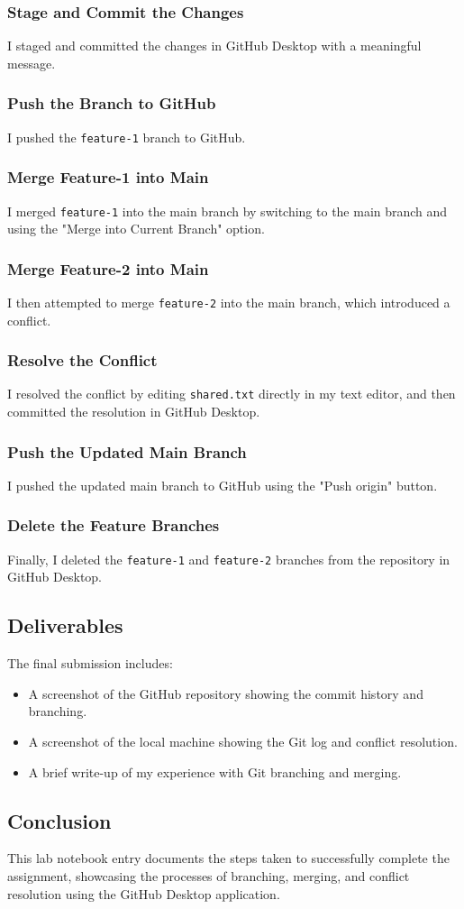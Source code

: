 \subsubsection{Stage and Commit the Changes}
I staged and committed the changes in GitHub Desktop with a meaningful message.

\subsubsection{Push the Branch to GitHub}
I pushed the \texttt{feature-1} branch to GitHub.

\subsubsection{Merge Feature-1 into Main}
I merged \texttt{feature-1} into the main branch by switching to the main branch and using the "Merge into Current Branch" option.

\subsubsection{Merge Feature-2 into Main}
I then attempted to merge \texttt{feature-2} into the main branch, which introduced a conflict.

\subsubsection{Resolve the Conflict}
I resolved the conflict by editing \texttt{shared.txt} directly in my text editor, and then committed the resolution in GitHub Desktop.

\subsubsection{Push the Updated Main Branch}
I pushed the updated main branch to GitHub using the "Push origin" button.

\subsubsection{Delete the Feature Branches}
Finally, I deleted the \texttt{feature-1} and \texttt{feature-2} branches from the repository in GitHub Desktop.

\subsection{Deliverables}
The final submission includes:
\begin{itemize}
    \item A screenshot of the GitHub repository showing the commit history and branching.
    \item A screenshot of the local machine showing the Git log and conflict resolution.
    \item A brief write-up of my experience with Git branching and merging.
\end{itemize}

\subsection{Conclusion}
This lab notebook entry documents the steps taken to successfully complete the assignment, showcasing the processes of branching, merging, and conflict resolution using the GitHub Desktop application.

